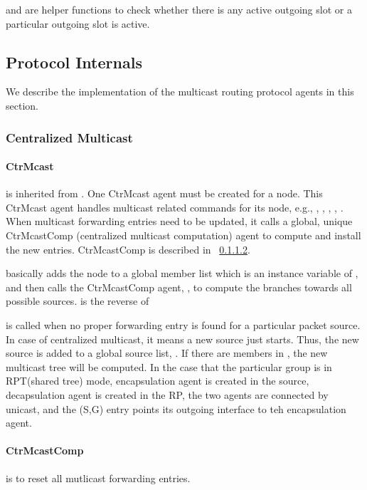  and  are helper functions to check whether there is any active outgoing slot or a particular outgoing slot is active. 

\subsection{Protocol Internals}
\label{sec:mcastproto-internals}

We describe the implementation of the multicast routing protocol agents in this section.

\subsubsection{Centralized Multicast}

\paragraph{CtrMcast}
\label{CtrMcast}
 is inherited from .  One CtrMcast agent must be created for a node.  This CtrMcast agent handles multicast related commands for its node, e.g., , , , , .  When multicast forwarding entries need to be updated, it calls a global, unique CtrMcastComp (centralized multicast computation) agent to compute and install the new entries.  CtrMcastComp is described in ~\ref{CtrMcastComp}.

 basically adds the node to a global member list  which is an instance variable of , and then calls the CtrMcastComp agent, , to compute the branches towards all possible sources.  is the reverse of 

 is called when no proper forwarding entry is found for a particular packet source.  In case of centralized multicast, it means a new source just starts.  Thus, the new source is added to a global source list, .  If there are members in , the new multicast tree will be computed. In the case that the particular group is in RPT(shared tree) mode, encapsulation agent is created in the source, decapsulation agent is created in the RP, the two agents are connected by unicast, and the (S,G) entry points its outgoing interface to teh encapsulation agent.

\paragraph{CtrMcastComp}
\label{CtrMcastComp}
 is to reset all mutlicast forwarding entries.

